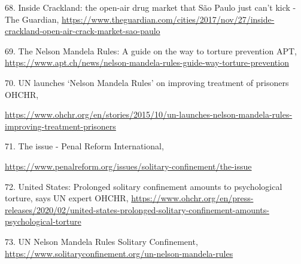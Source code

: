 68. Inside Crackland: the open-air drug market that São Paulo just can't kick - The Guardian, \url{https://www.theguardian.com/cities/2017/nov/27/inside-crackland-open-air-crack-market-sao-paulo}

69. The Nelson Mandela Rules: A guide on the way to torture prevention \textbar{} APT, \url{https://www.apt.ch/news/nelson-mandela-rules-guide-way-torture-prevention}

70. UN launches `Nelson Mandela Rules' on improving treatment of prisoners \textbar{} OHCHR,

\url{https://www.ohchr.org/en/stories/2015/10/un-launches-nelson-mandela-rules-improving-treatment-prisoners}

71. The issue - Penal Reform International,

\url{https://www.penalreform.org/issues/solitary-confinement/the-issue}

72. United States: Prolonged solitary confinement amounts to psychological torture, says UN expert \textbar{} OHCHR, \url{https://www.ohchr.org/en/press-releases/2020/02/united-states-prolonged-solitary-confinement-amounts-psychological-torture}

73. UN Nelson Mandela Rules \textbar{} Solitary Confinement, \url{https://www.solitaryconfinement.org/un-nelson-mandela-rules}
